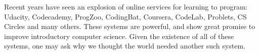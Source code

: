 \documentclass{sig-alternate}
\begin{document}
Recent years have seen an explosion of online services for learning
to program:  Udacity\cite{udacity}, Codecademy\cite{codeacademy},
ProgZoo\cite{progzoo}, 
CodingBat\cite{codingbat}, Coursera\cite{coursera}, CodeLab\cite{turingscraft},
Problets\cite{Kumar:2005:GPA:1163405.1163408}, CS Circles\cite{Pritchard:2013:CCI:2445196.2445370} and
many others.  These systems are powerful, and show great promise to
improve introductory computer science.  Given the existence of all of these
systems, one may ask why we thought
the world needed another such system.

%
%
%
%
%
\end{document}
